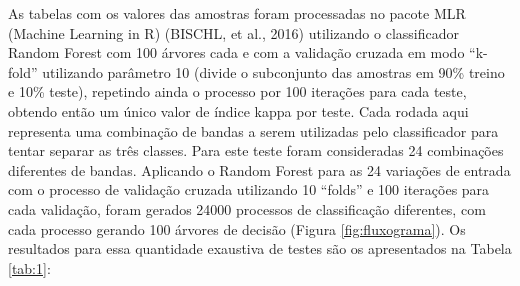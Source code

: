 \documentclass[12pt,a4paper]{article}
\begin{document}
As tabelas com os valores das amostras foram processadas no pacote MLR (Machine Learning in R) (BISCHL, et al., 2016) utilizando o classificador Random Forest com 100 árvores cada e com a validação cruzada em modo “k-fold” utilizando parâmetro 10 (divide o subconjunto das amostras em 90\% treino e 10\% teste), repetindo ainda o processo por 100 iterações para cada teste, obtendo então um único valor de índice kappa por teste. Cada rodada aqui representa uma combinação de bandas a serem utilizadas pelo classificador para tentar separar as três classes. Para este teste foram consideradas 24 combinações diferentes de bandas. Aplicando o Random Forest para as 24 variações de entrada com o processo de validação cruzada utilizando 10 “folds” e 100 iterações para cada validação, foram gerados 24000 processos de classificação diferentes, com cada processo gerando 100 árvores de decisão (Figura \ref{fig:fluxograma}). Os resultados para essa quantidade exaustiva de testes são os apresentados na Tabela \ref{tab:1}:
\end{document}

